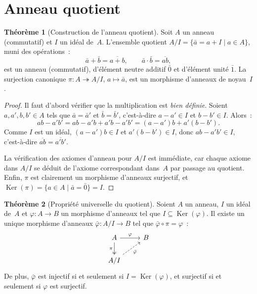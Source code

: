 \documentclass[12pt,a4paper,openany]{book}
\theoremstyle{definition}
\newtheorem{theoreme}{Théorème}[chapter]
\DeclareMathOperator{\Ker}{Ker}
\begin{document}
\section{Anneau quotient}\label{sec:anneau-quotient}

\begin{theoreme}[Construction de l'anneau quotient]%
\label{thm:anneau-quotient}
Soit $A$ un anneau (commutatif) et $I$ un idéal de~$A$. L'ensemble
quotient $A/I = \{\bar{a} = a + I \mid a \in A\}$, muni des opérations~:
\[
  \bar{a} + \bar{b} = \overline{a + b}, \qquad
  \bar{a} \cdot \bar{b} = \overline{ab},
\]
est un anneau (commutatif), d'élément neutre additif $\bar{0}$ et
d'élément unité $\bar{1}$. La surjection canonique
$\pi \colon A \twoheadrightarrow A/I$, $a \mapsto \bar{a}$, est un
morphisme d'anneaux de noyau~$I$.
\end{theoreme}

\begin{proof}
Il faut d'abord vérifier que la multiplication est \emph{bien définie}.
Soient $a, a', b, b' \in A$ tels que $\bar{a} = \bar{a}'$ et
$\bar{b} = \bar{b}'$, c'est-à-dire $a - a' \in I$ et $b - b' \in I$.
Alors~:
\[
  ab - a'b' = ab - a'b + a'b - a'b' = (a - a')b + a'(b - b').
\]
Comme $I$ est un idéal, $(a - a')b \in I$ et $a'(b - b') \in I$, donc
$ab - a'b' \in I$, c'est-à-dire $\overline{ab} = \overline{a'b'}$.

La vérification des axiomes d'anneau pour $A/I$ est immédiate, car chaque
axiome dans $A/I$ se déduit de l'axiome correspondant dans~$A$ par passage
au quotient. Enfin, $\pi$ est clairement un morphisme d'anneaux surjectif,
et $\Ker(\pi) = \{a \in A \mid \bar{a} = \bar{0}\} = I$.
\end{proof}

\begin{theoreme}[Propriété universelle du quotient]%
\label{thm:prop-univ-quotient-anneaux}
Soient $A$ un anneau, $I$ un idéal de~$A$ et $\varphi \colon A \to B$
un morphisme d'anneaux tel que $I \subseteq \Ker(\varphi)$. Il existe
un unique morphisme d'anneaux $\bar{\varphi} \colon A/I \to B$ tel que
$\bar{\varphi} \circ \pi = \varphi$~:
\[
\begin{tikzcd}
  A \arrow[r, "\varphi"] \arrow[d, two heads, "\pi"'] & B \\
  A/I \arrow[ru, dashed, "\bar{\varphi}"']
\end{tikzcd}
\]
De plus, $\bar{\varphi}$ est injectif si et seulement si
$I = \Ker(\varphi)$, et surjectif si et seulement si $\varphi$ est
surjectif.
\end{theoreme}
\end{document}
